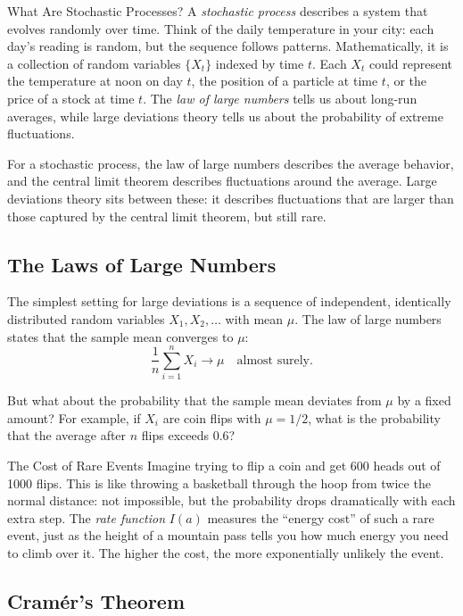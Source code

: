\begin{primer}{What Are Stochastic Processes?}
A \emph{stochastic process} describes a system that evolves randomly over time. Think of the daily temperature in your city: each day's reading is random, but the sequence follows patterns. Mathematically, it is a collection of random variables $\{X_t\}$ indexed by time $t$. Each $X_t$ could represent the temperature at noon on day $t$, the position of a particle at time $t$, or the price of a stock at time $t$. The \emph{law of large numbers} tells us about long-run averages, while large deviations theory tells us about the probability of extreme fluctuations.
\end{primer}

For a stochastic process, the law of large numbers describes the average behavior, and the central limit theorem describes fluctuations around the average. Large deviations theory sits between these: it describes fluctuations that are larger than those captured by the central limit theorem, but still rare.

\subsection{The Laws of Large Numbers}

The simplest setting for large deviations is a sequence of independent, identically distributed random variables $X_1, X_2, \ldots$ with mean $\mu$. The law of large numbers states that the sample mean converges to $\mu$:
\[
\frac{1}{n}\sum_{i=1}^n X_i \to \mu \quad \text{almost surely}.
\]

But what about the probability that the sample mean deviates from $\mu$ by a fixed amount? For example, if $X_i$ are coin flips with $\mu = 1/2$, what is the probability that the average after $n$ flips exceeds $0.6$?

\begin{analogy}{The Cost of Rare Events}
Imagine trying to flip a coin and get 600 heads out of 1000 flips. This is like throwing a basketball through the hoop from twice the normal distance: not impossible, but the probability drops dramatically with each extra step. The \emph{rate function} $I(a)$ measures the ``energy cost'' of such a rare event, just as the height of a mountain pass tells you how much energy you need to climb over it. The higher the cost, the more exponentially unlikely the event.
\end{analogy}

\subsection{Cram\'er's Theorem}

